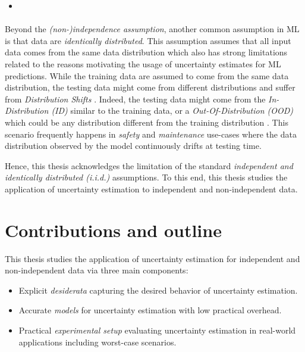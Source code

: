 \begin{itemize}
    \item {}
\end{itemize}

\paragraph*{} Beyond the \emph{(non-)independence assumption}, another common assumption in ML is that data are \emph{identically distributed}. 
This assumption assumes that all input data comes from the same data distribution which also has strong limitations related to the reasons motivating the usage of uncertainty estimates for ML predictions.
While the training data are assumed to come from the same data distribution, the testing data might come from different distributions and suffer from \emph{Distribution Shifts} \cite{rabanser2019shift, dataset-shif}. 
Indeed, the testing data might come from the \emph{In-Distribution (ID)} similar to the training data, or a \emph{Out-Of-Distribution (OOD)} which could be any distribution different from the training distribution \cite{ood-detection-survey, shen2021ood}.
This scenario frequently happens in \emph{safety} and \emph{maintenance} use-cases where the data distribution observed by the model continuously drifts at testing time. 

Hence, this thesis acknowledges the limitation of the standard \emph{independent and identically distributed (i.i.d.)} assumptions.
To this end, this thesis studies the application of uncertainty estimation to independent and non-independent data.

\section{Contributions and outline}

This thesis studies the application of uncertainty estimation for independent and non-independent data via three main components:
\begin{itemize}
    \item Explicit \emph{desiderata} capturing the desired behavior of uncertainty estimation.
    \item Accurate \emph{models} for uncertainty estimation with low practical overhead.
    \item Practical \emph{experimental setup} evaluating uncertainty estimation in real-world applications including worst-case scenarios.
\end{itemize} 

